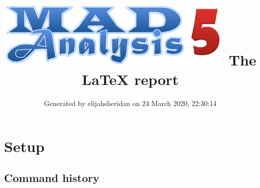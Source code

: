 \documentclass[a4paper, 10pt]{article}
\title{{\includegraphics[scale=.4]{logo.png}}\ The LaTeX report}
\author{Generated by elijahsheridan on 24 March 2020, 22:30:14}
\begin{document}
\maketitle
\flushbottom

\newpage
\section{ Setup}

\subsection{ Command history}
\end{document}
